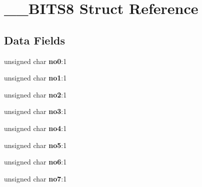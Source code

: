 \hypertarget{struct_____b_i_t_s8}{\section{\-\_\-\-\_\-\-B\-I\-T\-S8 Struct Reference}
\label{struct_____b_i_t_s8}
}
\subsection*{Data Fields}
\begin{DoxyCompactItemize}
\item 
\hypertarget{struct_____b_i_t_s8_a90c7e757436ee4edf435a5f496e885fc}{unsigned char {\bfseries no0}\-:1}\label{struct_____b_i_t_s8_a90c7e757436ee4edf435a5f496e885fc}

\item 
\hypertarget{struct_____b_i_t_s8_a5e700562ee05e48a1d5e8180f03d5de3}{unsigned char {\bfseries no1}\-:1}\label{struct_____b_i_t_s8_a5e700562ee05e48a1d5e8180f03d5de3}

\item 
\hypertarget{struct_____b_i_t_s8_a5989f24b0cabc9a72b5cc201d9aa393b}{unsigned char {\bfseries no2}\-:1}\label{struct_____b_i_t_s8_a5989f24b0cabc9a72b5cc201d9aa393b}

\item 
\hypertarget{struct_____b_i_t_s8_a6a7ac0b87a5635b5dc6d223c73a3c077}{unsigned char {\bfseries no3}\-:1}\label{struct_____b_i_t_s8_a6a7ac0b87a5635b5dc6d223c73a3c077}

\item 
\hypertarget{struct_____b_i_t_s8_a0856ba0e947c29b979817bd6f50afb65}{unsigned char {\bfseries no4}\-:1}\label{struct_____b_i_t_s8_a0856ba0e947c29b979817bd6f50afb65}

\item 
\hypertarget{struct_____b_i_t_s8_acef6b13ebc2ede508f9e5bb82c119b9b}{unsigned char {\bfseries no5}\-:1}\label{struct_____b_i_t_s8_acef6b13ebc2ede508f9e5bb82c119b9b}

\item 
\hypertarget{struct_____b_i_t_s8_aa0167c75168b4f048d3b704dd42ab9bb}{unsigned char {\bfseries no6}\-:1}\label{struct_____b_i_t_s8_aa0167c75168b4f048d3b704dd42ab9bb}

\item 
\hypertarget{struct_____b_i_t_s8_af2583058bb169ae07921868860b6ac94}{unsigned char {\bfseries no7}\-:1}\label{struct_____b_i_t_s8_af2583058bb169ae07921868860b6ac94}

\end{DoxyCompactItemize}


